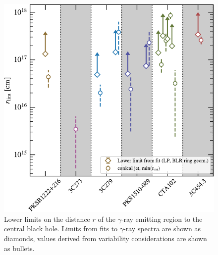 \documentclass[twocolumn,linenumbers]{aastex62}
\newcommand{\gray}{$\gamma$-ray\xspace}
\begin{document}
\begin{figure}
    \centering
    \includegraphics[width = .9\linewidth]{figures/limits.pdf}
    \caption{Lower limits on the distance $r$ of the \gray emitting region to the central black hole. Limits from fits to \gray spectra are shown as diamonds, values derived from variability considerations are shown as bullets. }
    \label{fig:blr_limits}
\end{figure}
\end{document}
